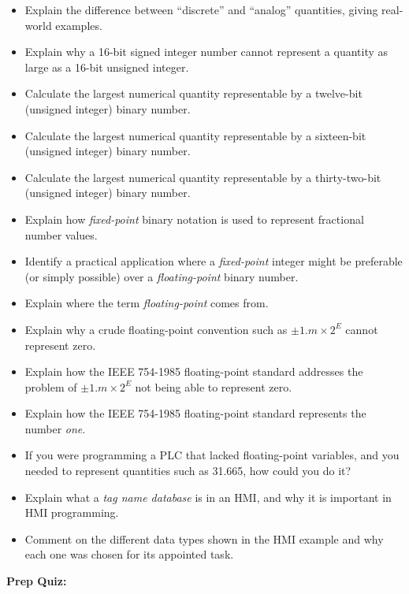 \begin{itemize}
\item{} Explain the difference between ``discrete'' and ``analog'' quantities, giving real-world examples.
\item{} Explain why a 16-bit signed integer number cannot represent a quantity as large as a 16-bit unsigned integer.
\item{} Calculate the largest numerical quantity representable by a twelve-bit (unsigned integer) binary number.
\item{} Calculate the largest numerical quantity representable by a sixteen-bit (unsigned integer) binary number.
\item{} Calculate the largest numerical quantity representable by a thirty-two-bit (unsigned integer) binary number.
\item{} Explain how {\it fixed-point} binary notation is used to represent fractional number values.
\item{} Identify a practical application where a {\it fixed-point} integer might be preferable (or simply possible) over a {\it floating-point} binary number.
\item{} Explain where the term {\it floating-point} comes from.
\item{} Explain why a crude floating-point convention such as $\pm 1.m \times 2^{E}$ cannot represent zero.
\item{} Explain how the IEEE 754-1985 floating-point standard addresses the problem of $\pm 1.m \times 2^{E}$ not being able to represent zero.
\item{} Explain how the IEEE 754-1985 floating-point standard represents the number {\it one}.
\item{} If you were programming a PLC that lacked floating-point variables, and you needed to represent quantities such as 31.665, how could you do it?
\item{} Explain what a {\it tag name database} is in an HMI, and why it is important in HMI programming.
\item{} Comment on the different data types shown in the HMI example and why each one was chosen for its appointed task.
\end{itemize}









\vfil \eject

\noindent
{\bf Prep Quiz:}

